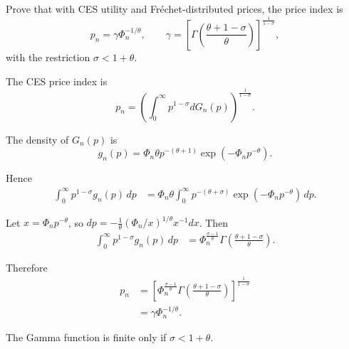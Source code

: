 
Prove that with CES utility and Fréchet-distributed prices, the price index is
\[
p_n = \gamma \Phi_n^{-1/\theta}, \qquad 
\gamma = \left[\Gamma\!\left(\frac{\theta+1-\sigma}{\theta}\right)\right]^{\frac{1}{1-\sigma}},
\]
with the restriction $\sigma < 1+\theta$.

\begin{solution}
The CES price index is
\[
p_n = \left( \int_0^\infty p^{1-\sigma} dG_n(p) \right)^{\tfrac{1}{1-\sigma}}.
\]

The density of $G_n(p)$ is
\[
g_n(p) = \Phi_n \theta p^{-(\theta+1)} \exp(-\Phi_n p^{-\theta}).
\]

Hence
\begin{align*}
\int_0^\infty p^{1-\sigma} g_n(p)\, dp
&= \Phi_n \theta \int_0^\infty p^{-(\theta+\sigma)} 
    \exp(-\Phi_n p^{-\theta})\, dp.
\end{align*}

Let $x = \Phi_n p^{-\theta}$, so $dp = -\tfrac{1}{\theta} (\Phi_n/x)^{1/\theta} x^{-1} dx$. Then
\begin{align*}
\int_0^\infty p^{1-\sigma} g_n(p)\, dp
&= \Phi_n^{\tfrac{\sigma-1}{\theta}} 
   \Gamma\!\left(\tfrac{\theta+1-\sigma}{\theta}\right).
\end{align*}

Therefore
\begin{align*}
p_n &= \left[\Phi_n^{\tfrac{\sigma-1}{\theta}} 
   \Gamma\!\left(\tfrac{\theta+1-\sigma}{\theta}\right)\right]^{\tfrac{1}{1-\sigma}} \\
&= \gamma \Phi_n^{-1/\theta}.
\end{align*}

The Gamma function is finite only if $\sigma < 1 + \theta$.
\end{solution}
